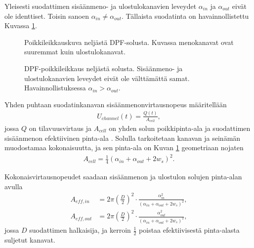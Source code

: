 Yleisesti suodattimen sisäänmeno- ja ulostulokanavien leveydet \(\alpha_{in}\) ja \(\alpha_{out}\) eivät ole identtiset. Toisin sanoen \(\alpha_{in} \neq \alpha_{out}\). Tällaista suodatinta on havainnollistettu Kuvassa \ref{fig:hac_dpf_clean}.
%
\begin{figure}[H]
    \centering 
               {Poikkileikkauskuva neljästä DPF-solusta. Kuvassa menokanavat ovat suuremmat kuin ulostulokanavat.}
    \caption{DPF-poikkileikkaus neljästä solusta. Sisäänmeno- ja ulostulokanavien leveydet eivät ole välttämättä samat. Havainnollistuksessa \(\alpha_{in}>\alpha_{out}\).}
    \label{fig:hac_dpf_clean}
\end{figure}

Yhden puhtaan suodatinkanavan sisäänmenonvirtausnopeus määritellään 
\begin{align}\label{eq:flow_velocity_clean}
    U_{channel}(t) = \frac{Q(t)}{A_{cell}},
\end{align}
jossa \(Q\) on tilavuusvirtaus ja \(A_{cell}\) on  yhden solun poikkipinta-ala ja suodattimen sisäänmenon efektiivinen pinta-ala \cite{Konstandopoulos2000}. Solulla tarkoitetaan kanavan ja seinämän muodostamaa kokonaisuutta, ja sen pinta-ala on Kuvan \ref{fig:hac_dpf_clean}  geometriaan nojaten
\begin{align}
    A_{cell}=\frac{1}{4}(\alpha_{in}+\alpha_{out}+2w_s)^2.
\end{align}

Kokonaisvirtausnopeudet saadaan sisäänmenon ja ulostulon solujen pinta-alan avulla
\begin{align}
    A_{eff, in} &= 2 \pi \left(\frac{D}{2}\right)^2 \cdot \frac{\alpha_{in}^2}{(\alpha_{in}+\alpha_{out}+2w_s)^2}, \label{eq:area_eff_in} \\
    A_{eff, out} &= 2 \pi \left(\frac{D}{2}\right)^2 \cdot \frac{\alpha_{out}^2}{(\alpha_{in}+\alpha_{out}+2w_s)^2},\label{eq:area_eff_out}
\end{align}
jossa \(D \) suodattimen halkaisija, ja kerroin \(\frac{1}{2}\) poistaa efektiivisestä pinta-alasta suljetut kanavat.

